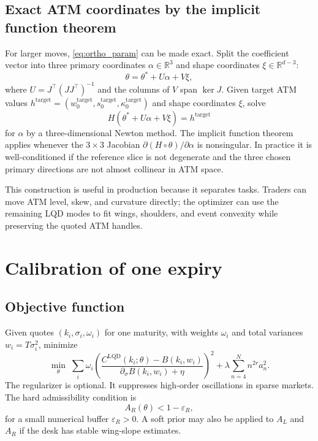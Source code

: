 \documentclass[11pt]{article}
\newcommand{\R}{\mathbb{R}}
\newcommand{\1}{\mathbf{1}}
\newcommand{\eps}{\varepsilon}
\begin{document}
\subsection{Exact ATM coordinates by the implicit function theorem}

For larger moves, \eqref{eq:ortho_param} can be made exact.  Split the coefficient vector into three primary coordinates $\alpha\in\R^3$ and shape coordinates $\xi\in\R^{d-3}$:
\begin{equation}
    \theta=\theta^*+U\alpha+V\xi,
\end{equation}
where $U=J^\top(JJ^\top)^{-1}$ and the columns of $V$ span $\ker J$.  Given target ATM values $h^{\mathrm{target}}=(w_0^{\mathrm{target}},s_0^{\mathrm{target}},\kappa_0^{\mathrm{target}})$ and shape coordinates $\xi$, solve
\begin{equation}
    H(\theta^*+U\alpha+V\xi)=h^{\mathrm{target}}\label{eq:implicit_atm}
\end{equation}
for $\alpha$ by a three-dimensional Newton method.  The implicit function theorem applies whenever the $3\times3$ Jacobian $\partial(H\circ\theta)/\partial\alpha$ is nonsingular.  In practice it is well-conditioned if the reference slice is not degenerate and the three chosen primary directions are not almost collinear in ATM space.

This construction is useful in production because it separates tasks.  Traders can move ATM level, skew, and curvature directly; the optimizer can use the remaining LQD modes to fit wings, shoulders, and event convexity while preserving the quoted ATM handles.

\section{Calibration of one expiry}

\subsection{Objective function}

Given quotes $(k_i,\sigma_i,\omega_i)$ for one maturity, with weights $\omega_i$ and total variances $w_i=T\sigma_i^2$, minimize
\begin{equation}
    \min_\theta\; \sum_i \omega_i
    \left(\frac{C^{\mathrm{LQD}}(k_i;\theta)-B(k_i,w_i)}{\partial_\sigma B(k_i,w_i)+\eta}\right)^2
    +\lambda\sum_{n=4}^{N} n^{2r}a_n^2.\label{eq:calib_objective}
\end{equation}
The regularizer is optional.  It suppresses high-order oscillations in sparse markets.  The hard admissibility condition is
\begin{equation}
    A_R(\theta)<1-\eps_R,\label{eq:right_admissible}
\end{equation}
for a small numerical buffer $\eps_R>0$.  A soft prior may also be applied to $A_L$ and $A_R$ if the desk has stable wing-slope estimates.
\end{document}
